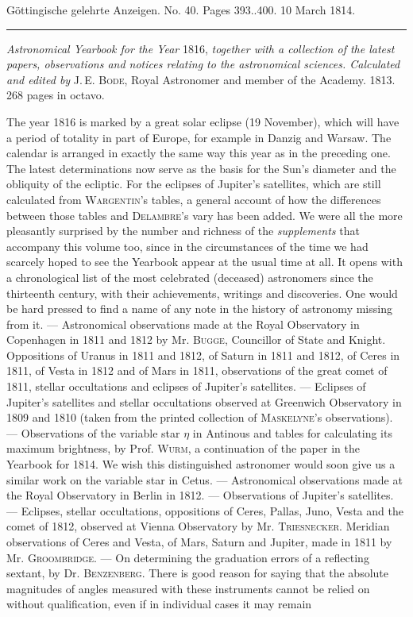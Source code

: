 \clearpage
{}
\hypertarget{native-568-lower}{}
\begin{center}\small Göttingische gelehrte Anzeigen. No. 40. Pages 393..400. 10 March 1814.\\[3pt]\rule{.72\linewidth}{.3pt}\end{center}

\emph{Astronomical Yearbook for the Year} 1816, \emph{together with a collection of the latest papers, observations and notices relating to the astronomical sciences. Calculated and edited by} J.\,E. \textsc{Bode}, Royal Astronomer and member of the Academy. 1813. 268 pages in octavo.

The year 1816 is marked by a great solar eclipse (19 November), which will have a period of totality in part of Europe, for example in Danzig and Warsaw. The calendar is arranged in exactly the same way this year as in the preceding one. The latest determinations now serve as the basis for the Sun's diameter and the obliquity of the ecliptic. For the eclipses of Jupiter's satellites, which are still calculated from \textsc{Wargentin}'s tables, a general account of how the differences between those tables and \textsc{Delambre}'s vary has been added. We were all the more pleasantly surprised by the number and richness of the \emph{supplements} that accompany this volume too, since in the circumstances of the time we had scarcely hoped to see the Yearbook appear at the usual time at all. It opens with a chronological list of the most celebrated (deceased) astronomers since the thirteenth century, with their achievements, writings and discoveries. One would be hard pressed to find a name of any note in the history of astronomy missing from it. — Astronomical observations made at the Royal Observatory in Copenhagen in 1811 and 1812 by Mr. \textsc{Bugge}, Councillor of State and Knight. Oppositions of Uranus in 1811 and 1812, of Saturn in 1811 and 1812, of Ceres in 1811, of Vesta in 1812 and of Mars in 1811, observations of the great comet of 1811, stellar occultations and eclipses of Jupiter's satellites. — Eclipses of Jupiter's satellites and stellar occultations observed at Greenwich Observatory in 1809 and 1810 (taken from the printed collection of \textsc{Maskelyne}'s observations). — Observations of the variable star $\eta$ in Antinous and tables for calculating its maximum brightness, by Prof. \textsc{Wurm}, a continuation of the paper in the Yearbook for 1814. We wish this distinguished astronomer would soon give us a similar work on the variable star in Cetus. — Astronomical observations made at the Royal Observatory in Berlin in 1812. — Observations of Jupiter's satellites. — Eclipses, stellar occultations, oppositions of Ceres, Pallas, Juno, Vesta and the comet of 1812, observed at Vienna Observatory by Mr. \textsc{Triesnecker}. Meridian observations of Ceres and Vesta, of Mars, Saturn and Jupiter, made in 1811 by Mr. \textsc{Groombridge}. — On determining the graduation errors of a reflecting sextant, by Dr. \textsc{Benzenberg}. There is good reason for saying that the absolute magnitudes of angles measured with these instruments cannot be relied on without qualification, even if in individual cases it may remain 